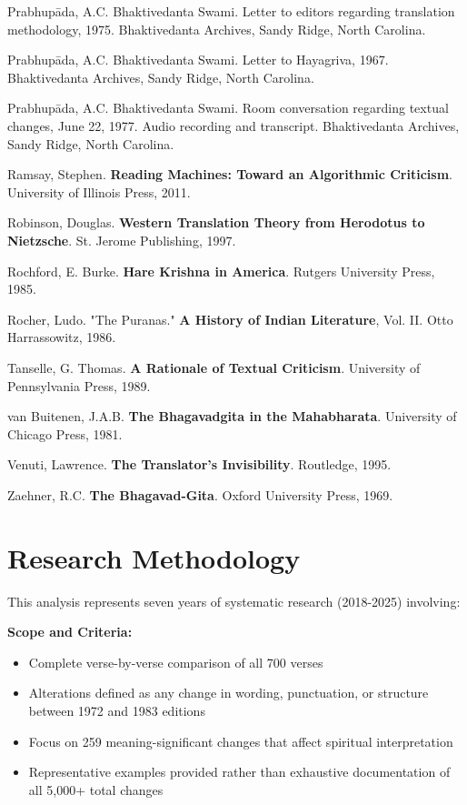 \documentclass[11pt,twoside]{book}
\begin{document}
Prabhupāda, A.C. Bhaktivedanta Swami. Letter to editors regarding translation methodology, 1975. Bhaktivedanta Archives, Sandy Ridge, North Carolina.

Prabhupāda, A.C. Bhaktivedanta Swami. Letter to Hayagriva, 1967. Bhaktivedanta Archives, Sandy Ridge, North Carolina.

Prabhupāda, A.C. Bhaktivedanta Swami. Room conversation regarding textual changes, June 22, 1977. Audio recording and transcript. Bhaktivedanta Archives, Sandy Ridge, North Carolina.

Ramsay, Stephen. \textbf{Reading Machines: Toward an Algorithmic Criticism}. University of Illinois Press, 2011.

Robinson, Douglas. \textbf{Western Translation Theory from Herodotus to Nietzsche}. St. Jerome Publishing, 1997.

Rochford, E. Burke. \textbf{Hare Krishna in America}. Rutgers University Press, 1985.

Rocher, Ludo. "The Puranas." \textbf{A History of Indian Literature}, Vol. II. Otto Harrassowitz, 1986.

Tanselle, G. Thomas. \textbf{A Rationale of Textual Criticism}. University of Pennsylvania Press, 1989.

van Buitenen, J.A.B. \textbf{The Bhagavadgita in the Mahabharata}. University of Chicago Press, 1981.

Venuti, Lawrence. \textbf{The Translator's Invisibility}. Routledge, 1995.

Zaehner, R.C. \textbf{The Bhagavad-Gita}. Oxford University Press, 1969.
\section*{Research Methodology}
\label{sec:orge2b7e87}

This analysis represents seven years of systematic research (2018-2025) involving:

\textbf{\textbf{Scope and Criteria:}}
\begin{itemize}
\item Complete verse-by-verse comparison of all 700 verses
\item Alterations defined as any change in wording, punctuation, or structure between 1972 and 1983 editions
\item Focus on 259 meaning-significant changes that affect spiritual interpretation
\item Representative examples provided rather than exhaustive documentation of all 5,000+ total changes
\end{itemize}
\end{document}
